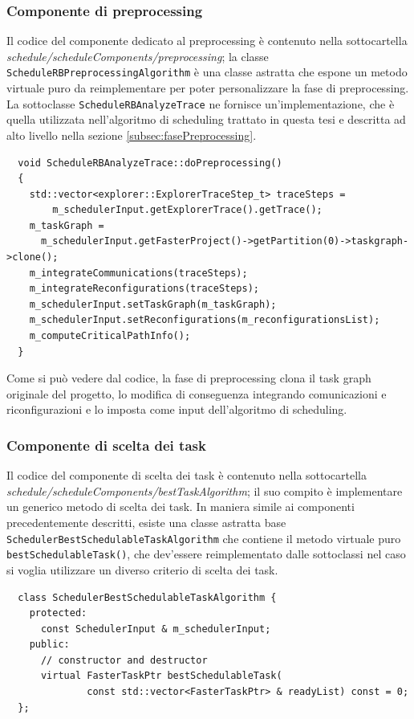 \subsubsection{Componente di preprocessing}
Il codice del componente dedicato al preprocessing è contenuto nella 
sottocartella \emph{schedule/scheduleComponents/preprocessing}; la classe 
\verb+ScheduleRBPreprocessingAlgorithm+ è una classe astratta che espone un 
metodo virtuale puro da reimplementare per poter personalizzare la fase di 
preprocessing. La sottoclasse \verb+ScheduleRBAnalyzeTrace+ ne fornisce 
un'implementazione, che è quella utilizzata nell'algoritmo di scheduling 
trattato in questa tesi e descritta ad alto livello nella sezione 
\ref{subsec:fasePreprocessing}.
\newline
\begin{verbatim}
  void ScheduleRBAnalyzeTrace::doPreprocessing()
  {
    std::vector<explorer::ExplorerTraceStep_t> traceSteps = 
        m_schedulerInput.getExplorerTrace().getTrace();
    m_taskGraph = 
      m_schedulerInput.getFasterProject()->getPartition(0)->taskgraph->clone();
    m_integrateCommunications(traceSteps);
    m_integrateReconfigurations(traceSteps);
    m_schedulerInput.setTaskGraph(m_taskGraph);
    m_schedulerInput.setReconfigurations(m_reconfigurationsList);
    m_computeCriticalPathInfo();
  }
\end{verbatim}

Come si può vedere dal codice, la fase di preprocessing clona il task graph 
originale del progetto, lo modifica di conseguenza integrando comunicazioni e 
riconfigurazioni e lo imposta come input dell'algoritmo di scheduling.

\subsubsection{Componente di scelta dei task}
Il codice del componente di scelta dei task è contenuto nella sottocartella 
\emph{schedule/scheduleComponents/bestTaskAlgorithm}; il suo compito è 
implementare un generico metodo di scelta dei task. In maniera simile ai 
componenti precedentemente descritti, esiste una classe astratta base 
\verb+SchedulerBestSchedulableTaskAlgorithm+ che contiene il metodo virtuale 
puro \verb+bestSchedulableTask()+, che dev'essere reimplementato dalle 
sottoclassi nel caso si voglia utilizzare un diverso criterio di scelta dei 
task.
\newline
\begin{verbatim}
  class SchedulerBestSchedulableTaskAlgorithm {
    protected:
      const SchedulerInput & m_schedulerInput;
    public:
      // constructor and destructor
      virtual FasterTaskPtr bestSchedulableTask(
              const std::vector<FasterTaskPtr> & readyList) const = 0;
  };
\end{verbatim}

